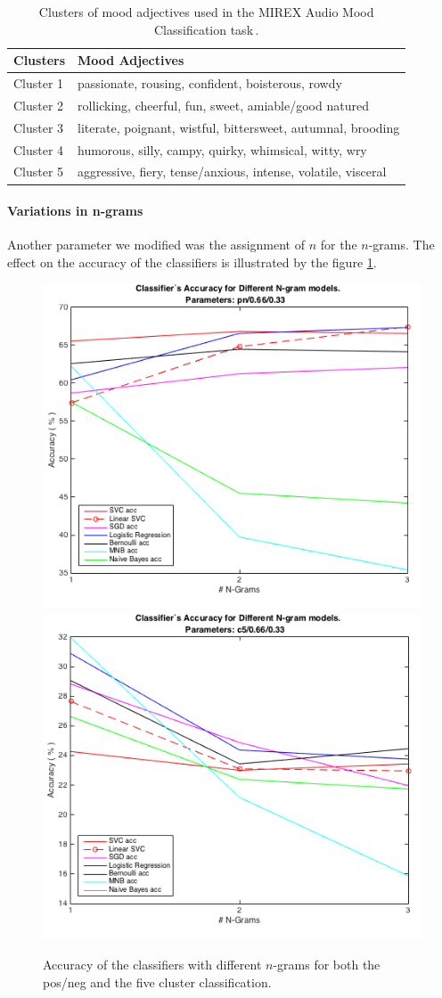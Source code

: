\documentclass[a4paper,12pt]{article}
\begin{document}
\begin{table}
\begin{center}
\begin{tabular}{| l | l |}
\hline
\textbf{Clusters} & \textbf{Mood Adjectives} \\ \hline \hline 
Cluster 1 & passionate, rousing, confident, boisterous, rowdy \\ \hline
Cluster 2 & rollicking, cheerful, fun, sweet, amiable/good natured \\ \hline
Cluster 3 & literate, poignant, wistful, bittersweet, autumnal, brooding \\ \hline
Cluster 4 & humorous, silly, campy, quirky, whimsical, witty, wry \\ \hline
Cluster 5 & aggressive, fiery, tense/anxious, intense, volatile, visceral \\ \hline
\end{tabular}
\caption{Clusters of mood adjectives used in the MIREX Audio Mood Classification task\,\cite{downie20082007}.}
\label{tab:moodClusters}
\end{center}
\end{table}

\paragraph{Variations in n-grams} Another parameter we modified was the assignment of $n$ for the $n$-grams. The effect on the accuracy of the classifiers is illustrated by the figure \ref{fig:nGram}.

\begin{figure}
\centering
\includegraphics[width=0.48\linewidth]{pl1}
\includegraphics[width=0.48\linewidth]{pl2}
\caption{Accuracy of the classifiers with different $n$-grams for both the pos/neg and the five cluster classification.}
\label{fig:nGram}
\end{figure}
\end{document}
